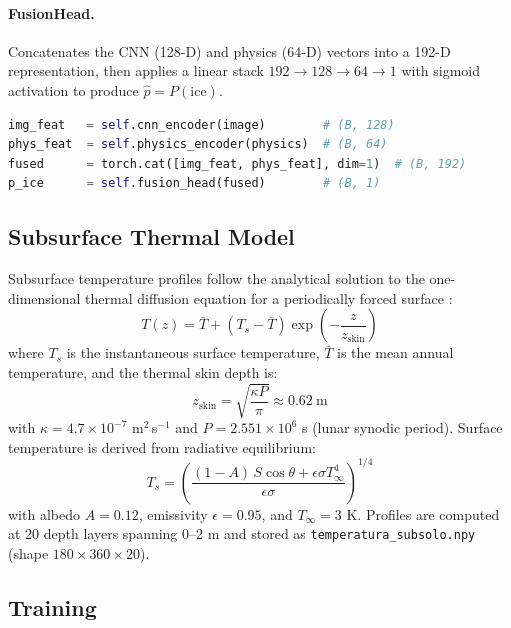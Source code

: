 \documentclass[12pt,a4paper]{article}
\begin{document}
\paragraph{FusionHead.} Concatenates the CNN (128-D) and physics (64-D) vectors
into a 192-D representation, then applies a linear stack
$192 \to 128 \to 64 \to 1$ with sigmoid activation to produce $\hat{p} = P(\text{ice})$.

\begin{lstlisting}[language=Python, caption={LunarCNN forward pass (simplified).}, label=lst:arch]
img_feat   = self.cnn_encoder(image)        # (B, 128)
phys_feat  = self.physics_encoder(physics)  # (B, 64)
fused      = torch.cat([img_feat, phys_feat], dim=1)  # (B, 192)
p_ice      = self.fusion_head(fused)        # (B, 1)
\end{lstlisting}

\subsection{Subsurface Thermal Model}
\label{sec:thermal-model}

Subsurface temperature profiles follow the analytical solution to the one-dimensional
thermal diffusion equation for a periodically forced surface \citep{vasavada2012}:
\begin{equation}
  T(z) = \bar{T} + \left(T_s - \bar{T}\right) \exp\!\left(-\frac{z}{z_\text{skin}}\right)
\end{equation}
where $T_s$ is the instantaneous surface temperature, $\bar{T}$ is the mean annual
temperature, and the thermal skin depth is:
\begin{equation}
  z_\text{skin} = \sqrt{\frac{\kappa P}{\pi}} \approx 0.62\ \text{m}
\end{equation}
with $\kappa = 4.7 \times 10^{-7}$ m$^2$\,s$^{-1}$ and $P = 2.551 \times 10^6$ s
(lunar synodic period). Surface temperature is derived from radiative equilibrium:
\begin{equation}
  T_s = \left(\frac{(1 - A)\,S\cos\theta + \epsilon\sigma T_\infty^4}{\epsilon\sigma}\right)^{1/4}
\end{equation}
with albedo $A = 0.12$, emissivity $\epsilon = 0.95$, and $T_\infty = 3$ K.
Profiles are computed at 20 depth layers spanning 0–2 m and stored as
\texttt{temperatura\_subsolo.npy} (shape $180 \times 360 \times 20$).

\subsection{Training}
\end{document}
